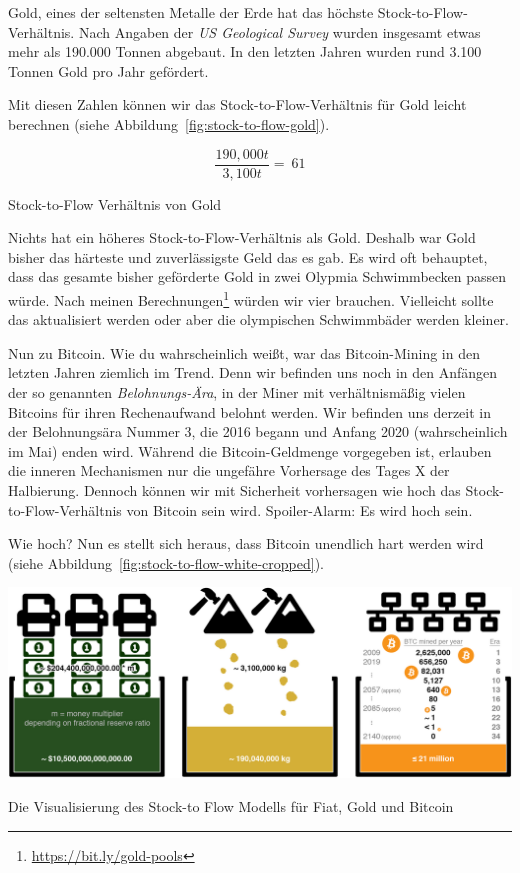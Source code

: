 Gold, eines der seltensten Metalle der Erde hat das höchste
Stock-to-Flow-Verhältnis. Nach Angaben der \textit{US Geological Survey} wurden
insgesamt etwas mehr als 190.000 Tonnen abgebaut. In den letzten Jahren wurden
rund 3.100 Tonnen Gold pro Jahr gefördert.~\cite{mineral-commodity-summaries}

Mit diesen Zahlen können wir das Stock-to-Flow-Verhältnis für Gold leicht
berechnen (siehe Abbildung~\ref{fig:stock-to-flow-gold}).

\begin{center}
  \centering
  \begin{equation}
  \frac{190,000 t}{3,100 t} = ~ 61
  \end{equation}
  \caption{Stock-to-Flow Verhältnis von Gold}
  \label{fig:stock-to-flow-gold}
\end{center}

Nichts hat ein höheres Stock-to-Flow-Verhältnis als Gold. Deshalb war Gold
bisher das härteste und zuverlässigste Geld das es gab. Es wird oft behauptet,
dass das gesamte bisher geförderte Gold in zwei Olypmia Schwimmbecken passen
würde. Nach meinen Berechnungen\footnote{\url{https://bit.ly/gold-pools}} würden
wir vier brauchen. Vielleicht sollte das aktualisiert werden oder aber die
olympischen Schwimmbäder werden kleiner.

Nun zu Bitcoin. Wie du wahrscheinlich weißt, war das Bitcoin-Mining in den
letzten Jahren ziemlich im Trend. Denn wir befinden uns noch in den Anfängen der
so genannten \textit{Belohnungs-Ära}, in der Miner mit verhältnismäßig vielen
Bitcoins für ihren Rechenaufwand belohnt werden. Wir befinden uns derzeit in der
Belohnungsära Nummer 3, die 2016 begann und Anfang 2020 (wahrscheinlich im Mai)
enden wird. Während die Bitcoin-Geldmenge vorgegeben ist, erlauben die inneren
Mechanismen nur die ungefähre Vorhersage des Tages X der Halbierung. Dennoch
können wir mit Sicherheit vorhersagen wie hoch das Stock-to-Flow-Verhältnis von
Bitcoin sein wird. Spoiler-Alarm: Es wird hoch sein.

Wie hoch? Nun es stellt sich heraus, dass Bitcoin unendlich hart werden wird
(siehe Abbildung~\ref{fig:stock-to-flow-white-cropped}).

\begin{center}
  \includegraphics[width=\textwidth]{assets/images/stock-to-flow-white-cropped.png}
  \caption{Die Visualisierung des Stock-to Flow Modells für Fiat, Gold und Bitcoin}
  \label{fig:stock-to-flow-white-cropped}
\end{center}

